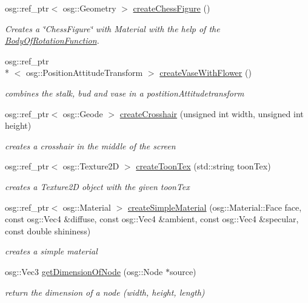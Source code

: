 \begin{DoxyCompactItemize}
osg\+::ref\+\_\+ptr$<$ osg\+::\+Geometry $>$ \hyperlink{namespacebrtr_a118d4013732dea1a161b6d225df6dc2e}{create\+Chess\+Figure} ()
\begin{DoxyCompactList}\small\item\em Creates a \char`\"{}\+Chess\+Figure\char`\"{} with Material with the help of the \hyperlink{structbrtr_1_1_body_of_rotation_function}{Body\+Of\+Rotation\+Function}. \end{DoxyCompactList}\item 
osg\+::ref\+\_\+ptr\\*
$<$ osg\+::\+Position\+Attitude\+Transform $>$ \hyperlink{namespacebrtr_a05625aff9337331ae351d283f79f0f1e}{create\+Vase\+With\+Flower} ()
\begin{DoxyCompactList}\small\item\em combines the stalk, bud and vase in a postition\+Attitudetransform \end{DoxyCompactList}\item 
osg\+::ref\+\_\+ptr$<$ osg\+::\+Geode $>$ \hyperlink{namespacebrtr_a31c533ae635c528c761cc83e34e91b2f}{create\+Crosshair} (unsigned int width, unsigned int height)
\begin{DoxyCompactList}\small\item\em creates a crosshair in the middle of the screen \end{DoxyCompactList}\item 
osg\+::ref\+\_\+ptr$<$ osg\+::\+Texture2\+D $>$ \hyperlink{namespacebrtr_aea7b3b188858f0bce09f2450a749f497}{create\+Toon\+Tex} (std\+::string toon\+Tex)
\begin{DoxyCompactList}\small\item\em creates a Texture2\+D object with the given toon\+Tex \end{DoxyCompactList}\item 
osg\+::ref\+\_\+ptr$<$ osg\+::\+Material $>$ \hyperlink{namespacebrtr_a7b54dcabf5846ea963221e59b38b0a79}{create\+Simple\+Material} (osg\+::\+Material\+::\+Face face, const osg\+::\+Vec4 \&diffuse, const osg\+::\+Vec4 \&ambient, const osg\+::\+Vec4 \&specular, const double shininess)
\begin{DoxyCompactList}\small\item\em creates a simple material \end{DoxyCompactList}\item 
osg\+::\+Vec3 \hyperlink{namespacebrtr_a24ba7c5d07ad50afb09990116dd3556d}{get\+Dimension\+Of\+Node} (osg\+::\+Node $\ast$source)
\begin{DoxyCompactList}\small\item\em return the dimension of a node (width, height, length) \end{DoxyCompactList}\item 

\end{DoxyCompactItemize}

